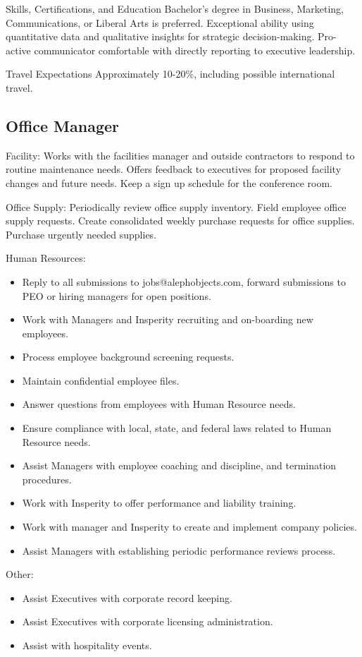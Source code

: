 Skills, Certifications, and Education
Bachelor’s degree in Business, Marketing, Communications, or Liberal Arts is preferred.
Exceptional ability using quantitative data and qualitative insights for strategic decision-making.
Pro-active communicator comfortable with directly reporting to executive leadership.

Travel Expectations
Approximately 10-20\%, including possible international travel.

\subsection{Office Manager}
Facility:
Works with the facilities manager and outside contractors to respond to routine maintenance needs.  
Offers feedback to executives for proposed facility changes and future needs.
Keep a sign up schedule for the conference room.

Office Supply:
Periodically review office supply inventory.  
Field employee office supply requests.  
Create consolidated weekly purchase requests for office supplies.
Purchase urgently needed supplies.

Human Resources:
\begin{itemize}
 \item Reply to all submissions to jobs@alephobjects.com, forward submissions to PEO or hiring managers for open positions.
 \item Work with Managers and Insperity recruiting and on-boarding new employees.
 \item Process employee background screening requests.
 \item Maintain confidential employee files.
 \item Answer questions from employees with Human Resource needs.
 \item Ensure compliance with local, state, and federal laws related to Human Resource needs.
 \item Assist Managers with employee coaching and discipline, and termination procedures.
 \item Work with Insperity to offer performance and liability training.
 \item Work with manager and Insperity to create and implement company policies.
 \item Assist Managers with establishing periodic performance reviews process.
\end{itemize}

Other:
\begin{itemize}
 \item Assist Executives with corporate record keeping.
 \item Assist Executives with corporate licensing administration.
 \item Assist with hospitality events.
\end{itemize}

